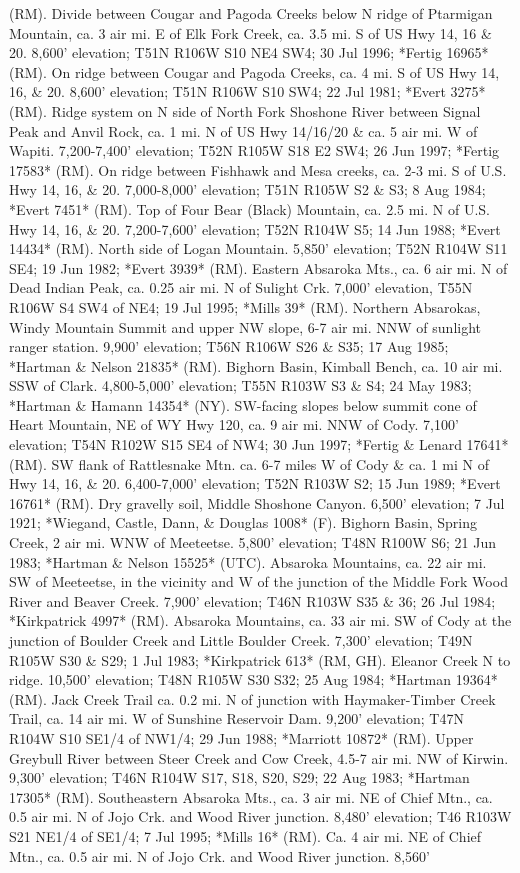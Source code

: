 (RM).  Divide between Cougar and Pagoda Creeks below N ridge of Ptarmigan Mountain, ca. 3 air mi. E of Elk Fork Creek, ca. 3.5 mi. S of US Hwy 14, 16 \& 20. 8,600’ elevation; T51N R106W S10 NE4 SW4; 30 Jul 1996; *Fertig 16965* (RM).  On ridge between Cougar and Pagoda Creeks, ca. 4 mi. S of US Hwy 14, 16, \& 20. 8,600’ elevation; T51N R106W S10 SW4; 22 Jul 1981; *Evert 3275* (RM).  Ridge system on N side of North Fork Shoshone River between Signal Peak and Anvil Rock, ca. 1 mi. N of US Hwy 14/16/20 \& ca. 5 air mi. W of Wapiti. 7,200-7,400’ elevation; T52N R105W S18 E2 SW4; 26 Jun 1997; *Fertig 17583* (RM).  On ridge between Fishhawk and Mesa creeks, ca. 2-3 mi. S of U.S. Hwy 14, 16, \& 20. 7,000-8,000’ elevation; T51N R105W S2 \& S3; 8 Aug 1984; *Evert 7451* (RM).  Top of Four Bear (Black) Mountain, ca. 2.5 mi. N of U.S. Hwy 14, 16, \& 20. 7,200-7,600’ elevation; T52N R104W S5; 14 Jun 1988; *Evert 14434* (RM).  North side of Logan Mountain. 5,850’ elevation; T52N R104W S11 SE4; 19 Jun 1982; *Evert 3939* (RM).  Eastern Absaroka Mts., ca. 6 air mi. N of Dead Indian Peak, ca. 0.25 air mi. N of Sulight Crk.  7,000’ elevation, T55N R106W S4 SW4 of NE4; 19 Jul 1995; *Mills 39* (RM).  Northern Absarokas, Windy Mountain Summit and upper NW slope, 6-7 air mi. NNW of sunlight ranger station.  9,900’ elevation; T56N R106W S26 \& S35; 17 Aug 1985; *Hartman \& Nelson 21835* (RM).  Bighorn Basin, Kimball Bench, ca. 10 air mi. SSW of Clark.  4,800-5,000’ elevation; T55N R103W S3 \& S4; 24 May 1983; *Hartman \& Hamann 14354* (NY).  SW-facing slopes below summit cone of Heart Mountain, NE of WY Hwy 120, ca. 9 air mi. NNW of Cody.  7,100’ elevation; T54N R102W S15 SE4 of NW4; 30 Jun 1997; *Fertig \& Lenard 17641* (RM).  SW flank of Rattlesnake Mtn. ca. 6-7 miles W of Cody \& ca. 1 mi N of Hwy 14, 16, \& 20. 6,400-7,000' elevation; T52N R103W S2; 15 Jun 1989; *Evert 16761* (RM).  Dry gravelly soil, Middle Shoshone Canyon.  6,500’ elevation; 7 Jul 1921; *Wiegand, Castle, Dann, \& Douglas 1008* (F).  Bighorn Basin, Spring Creek, 2 air mi. WNW of Meeteetse.  5,800’ elevation; T48N R100W S6; 21 Jun 1983; *Hartman \& Nelson 15525* (UTC).  Absaroka Mountains, ca. 22 air mi. SW of Meeteetse, in the vicinity and W of the junction of the Middle Fork Wood River and Beaver Creek.  7,900’ elevation; T46N R103W S35 \& 36; 26 Jul 1984; *Kirkpatrick 4997* (RM).  Absaroka Mountains, ca. 33 air mi. SW of Cody at the junction of Boulder Creek and Little Boulder Creek. 7,300’ elevation; T49N R105W S30 & S29; 1 Jul 1983; *Kirkpatrick 613* (RM, GH).  Eleanor Creek N to ridge. 10,500’ elevation; T48N R105W S30 S32; 25 Aug 1984; *Hartman 19364* (RM).  Jack Creek Trail ca. 0.2 mi. N of junction with Haymaker-Timber Creek Trail, ca. 14 air mi. W of Sunshine Reservoir Dam.  9,200’ elevation; T47N R104W S10 SE1/4 of NW1/4; 29 Jun 1988; *Marriott 10872* (RM).  Upper Greybull River between Steer Creek and Cow Creek, 4.5-7 air mi. NW of Kirwin. 9,300’ elevation; T46N R104W S17, S18, S20, S29; 22 Aug 1983; *Hartman 17305* (RM).  Southeastern Absaroka Mts., ca. 3 air mi. NE of Chief Mtn., ca. 0.5 air mi. N of Jojo Crk. and Wood River junction.  8,480’ elevation; T46 R103W S21 NE1/4 of SE1/4; 7 Jul 1995; *Mills 16* (RM).  Ca. 4 air mi. NE of Chief Mtn., ca. 0.5 air mi. N of Jojo Crk. and Wood River junction.  8,560’ 